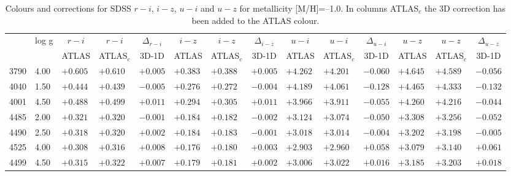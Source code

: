 \documentclass[]{aa}
\def\teff{$T\rm_{eff}$}
\begin{document}
\begin{appendix}
\begin{table*}
\caption{\label{SDSS_2_m10}
Colours and corrections for  SDSS $r-i$, $i-z$, $u-i$ and $u-z$ for metallicity [M/H]=--1.0. In columns ATLAS$_c$ the 3D correction
has been added to the ATLAS colour.  }
\renewcommand{\tabcolsep}{3pt}
\tabskip=0pt
\begin{center}
\begin{tabular}{llllllllllllll}
\hline\noalign{\smallskip}
\multicolumn{1}{c}{\teff} & 
\multicolumn{1}{c}{log g} & 
\multicolumn{1}{c}{$r-i$} &
\multicolumn{1}{c}{$r-i$} &
\multicolumn{1}{c}{$\Delta_{r-i}$} &
\multicolumn{1}{c}{$i-z$} &
\multicolumn{1}{c}{$i-z$} &
\multicolumn{1}{c}{$\Delta_{i-z}$} &
\multicolumn{1}{c}{$u-i$} &
\multicolumn{1}{c}{$u-i$} &
\multicolumn{1}{c}{$\Delta_{u-i}$} & 
\multicolumn{1}{c}{$u-z$} &
\multicolumn{1}{c}{$u-z$} &
\multicolumn{1}{c}{$\Delta_{u-z}$} \\
\multicolumn{2}{c}{ } &  
\multicolumn{1}{c}{ATLAS} &
\multicolumn{1}{c}{ATLAS$_c$}&
\multicolumn{1}{c}{3D-1D}&
\multicolumn{1}{c}{ATLAS} &
\multicolumn{1}{c}{ATLAS$_c$}&
\multicolumn{1}{c}{3D-1D}&
\multicolumn{1}{c}{ATLAS} &
\multicolumn{1}{c}{ATLAS$_c$}&
\multicolumn{1}{c}{3D-1D}&
\multicolumn{1}{c}{ATLAS} &
\multicolumn{1}{c}{ATLAS$_c$}&
\multicolumn{1}{c}{3D-1D} \\
\hline\noalign{\smallskip}
\hline\noalign{\smallskip}
3790  &4.00 & $+0.605$ & $+0.610$ & $+0.005$ & $+0.383$ & $+0.388$ & $+0.005$ & $+4.262$ & $+4.201$ & $-0.060$ & $+4.645$ & $+4.589$ & $-0.056$ \\
4040  &1.50 & $+0.444$ & $+0.439$ & $-0.005$ & $+0.276$ & $+0.272$ & $-0.004$ & $+4.189$ & $+4.061$ & $-0.128$ & $+4.465$ & $+4.333$ & $-0.132$ \\
4001  &4.50 & $+0.488$ & $+0.499$ & $+0.011$ & $+0.294$ & $+0.305$ & $+0.011$ & $+3.966$ & $+3.911$ & $-0.055$ & $+4.260$ & $+4.216$ & $-0.044$ \\
4485  &2.00 & $+0.321$ & $+0.320$ & $-0.001$ & $+0.184$ & $+0.182$ & $-0.002$ & $+3.124$ & $+3.074$ & $-0.050$ & $+3.308$ & $+3.256$ & $-0.052$ \\
4490  &2.50 & $+0.318$ & $+0.320$ & $+0.002$ & $+0.184$ & $+0.183$ & $-0.001$ & $+3.018$ & $+3.014$ & $-0.004$ & $+3.202$ & $+3.198$ & $-0.005$ \\
4525  &4.00 & $+0.308$ & $+0.316$ & $+0.008$ & $+0.176$ & $+0.180$ & $+0.003$ & $+2.903$ & $+2.960$ & $+0.058$ & $+3.079$ & $+3.140$ & $+0.061$ \\
4499  &4.50 & $+0.315$ & $+0.322$ & $+0.007$ & $+0.179$ & $+0.181$ & $+0.002$ & $+3.006$ & $+3.022$ & $+0.016$ & $+3.185$ & $+3.203$ & $+0.018$ \\

\end{tabular}
\end{center}
\end{table*}
\end{appendix}
\end{document}
